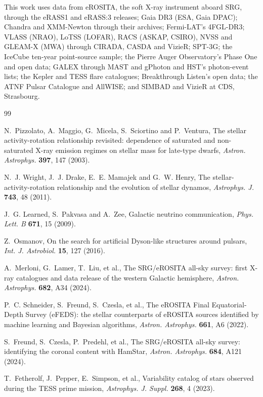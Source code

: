 \documentclass[3p,11pt]{elsarticle}
\begin{document}
This work uses data from eROSITA, the soft X-ray instrument aboard SRG, through the eRASS1
and eRASS:3 releases; Gaia DR3 (ESA, Gaia DPAC); Chandra and XMM-Newton through their
archives; Fermi-LAT's 4FGL-DR3; VLASS (NRAO), LoTSS (LOFAR), RACS (ASKAP, CSIRO), NVSS
and GLEAM-X (MWA) through CIRADA, CASDA and VizieR; SPT-3G; the IceCube ten-year
point-source sample; the Pierre Auger Observatory's Phase One and open data; GALEX
through MAST and gPhoton and HST's photon-event lists; the Kepler and TESS flare
catalogues; Breakthrough Listen's open data; the ATNF Pulsar Catalogue and AllWISE; and
SIMBAD and VizieR at CDS, Strasbourg.

\begin{thebibliography}{99}\small\raggedright
\setlength{\itemsep}{1pt}

N.~Pizzolato, A.~Maggio, G.~Micela, S.~Sciortino and P.~Ventura, The stellar
activity-rotation relationship revisited: dependence of saturated and non-saturated X-ray
emission regimes on stellar mass for late-type dwarfs, \emph{Astron. Astrophys.}
\textbf{397}, 147 (2003).

N.~J. Wright, J.~J. Drake, E.~E. Mamajek and G.~W. Henry, The stellar-activity-rotation
relationship and the evolution of stellar dynamos, \emph{Astrophys. J.} \textbf{743}, 48
(2011).

J.~G. Learned, S.~Pakvasa and A.~Zee, Galactic neutrino communication, \emph{Phys. Lett.
B} \textbf{671}, 15 (2009).

Z.~Osmanov, On the search for artificial Dyson-like structures around pulsars,
\emph{Int. J. Astrobiol.} \textbf{15}, 127 (2016).

A.~Merloni, G.~Lamer, T.~Liu, et al., The SRG/eROSITA all-sky survey: first X-ray
catalogues and data release of the western Galactic hemisphere, \emph{Astron.
Astrophys.} \textbf{682}, A34 (2024).

P.~C. Schneider, S.~Freund, S.~Czesla, et al., The eROSITA Final Equatorial-Depth Survey
(eFEDS): the stellar counterparts of eROSITA sources identified by machine learning and
Bayesian algorithms, \emph{Astron. Astrophys.} \textbf{661}, A6 (2022).

S.~Freund, S.~Czesla, P.~Predehl, et al., The SRG/eROSITA all-sky survey: identifying the
coronal content with HamStar, \emph{Astron. Astrophys.} \textbf{684}, A121 (2024).

T.~Fetherolf, J.~Pepper, E.~Simpson, et al., Variability catalog of stars observed during
the TESS prime mission, \emph{Astrophys. J. Suppl.} \textbf{268}, 4 (2023).


\end{thebibliography}
\end{document}

